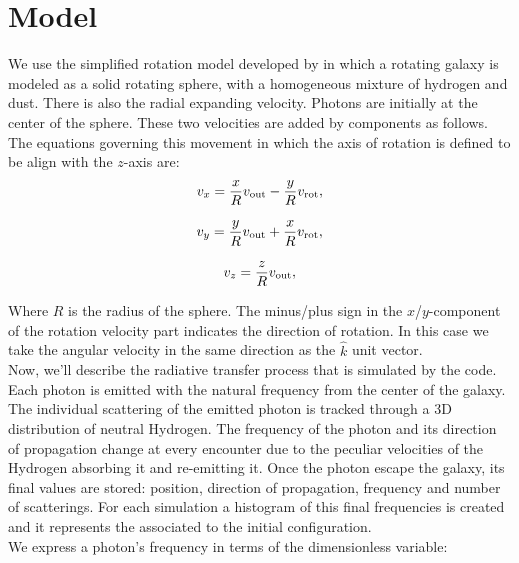 \setcounter{equation}{0}
\chapter{Model}

We use the simplified rotation model developed by \cite{Garavito14} in which a rotating galaxy is modeled as a solid rotating sphere, with a homogeneous mixture of hydrogen and dust. There is also the radial expanding velocity. Photons are initially at the center of the sphere. These two velocities are added by components as follows. The equations governing this movement in which the axis of rotation is defined to be align with the $z$-axis are: \\

\begin{equation}
v_{x}=\frac{x}{R}v_{\rm out}-\frac{y}{R}v_{\rm rot}, \label{subeq1}
\end{equation}

\begin{equation}
v_{y}=\frac{y}{R}v_{\rm out}+\frac{x}{R}v_{\rm rot}, \label{subeq2}
\end{equation}

\begin{equation}
v_{z}=\frac{z}{R}v_{\rm out}, \label{subeq3}
\end{equation}

Where $R$ is the radius of the sphere. The minus/plus sign in the $x$/$y$-component of the rotation velocity part indicates the direction of rotation. In this case we take the angular velocity in the same direction as the $\hat{k}$ unit vector. \\

Now, we'll describe the radiative transfer process that is simulated by the code. Each photon is emitted with the natural \lya frequency from the center of the galaxy. The individual scattering of the emitted photon is tracked through a 3D distribution of neutral Hydrogen. The frequency of the photon and its direction of propagation change at every encounter due to the peculiar velocities of the Hydrogen absorbing it and re-emitting it. Once the photon escape the galaxy, its final values are stored: position, direction of propagation, frequency and number of scatterings. For each simulation a histogram of this final frequencies is created and it represents the \lya associated to the initial configuration.\\

We express a photon's frequency in terms of the dimensionless variable:

